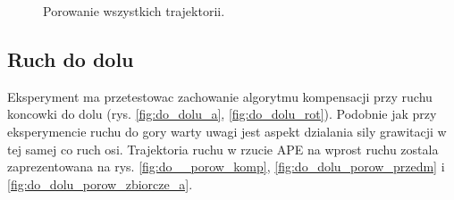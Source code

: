

\begin{figure}[h]
	\centering
	\caption{Porowanie wszystkich trajektorii.}
	\label{fig:do_gory_porow_zbiorcze}
\end{figure}

\subsection{Ruch do dolu}

Eksperyment ma przetestowac zachowanie algorytmu kompensacji przy ruchu koncowki do dolu (rys. \ref{fig:do_dolu_a}, \ref{fig:do_dolu_rot}). Podobnie jak przy eksperymencie ruchu do gory warty uwagi jest aspekt dzialania sily grawitacji w tej samej co ruch osi. Trajektoria ruchu w rzucie APE na wprost ruchu zostala zaprezentowana na rys. \ref{fig:do__porow_komp}, \ref{fig:do_dolu_porow_przedm} i \ref{fig:do_dolu_porow_zbiorcze_a}. 

